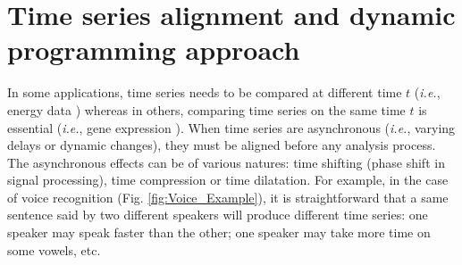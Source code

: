 \newpage
\section{Time series alignment and dynamic programming approach}

In some applications, time series needs to be compared at different time $t$ (\textit{i.e.}, energy data \cite{Najmeddine2012}) whereas in others, comparing time series on the same time $t$ is essential (\textit{i.e.}, gene expression \cite{Chouakria2007}). When time series are asynchronous (\textit{i.e.}, varying delays or dynamic changes), they must be aligned before any analysis process. The asynchronous effects can be of various natures: time shifting (phase shift in signal processing), time compression or time dilatation. For example, in the case of voice recognition (Fig. \ref{fig:Voice_Example}), it is straightforward that a same sentence said by two different speakers will produce different time series: one speaker may speak faster than the other; one speaker may take more time on some vowels, etc.

